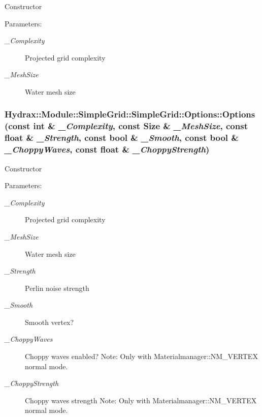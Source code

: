 Constructor \begin{Desc}
\item[Parameters:]
\begin{description}
\item[{\em \_\-Complexity}]Projected grid complexity \item[{\em \_\-MeshSize}]Water mesh size \end{description}
\end{Desc}
\hypertarget{struct_hydrax_1_1_module_1_1_simple_grid_1_1_options_5ed872d6df7b71b6e9a796946f995916}{
\subsubsection[{Options}]{\setlength{\rightskip}{0pt plus 5cm}Hydrax::Module::SimpleGrid::SimpleGrid::Options::Options (const int \& {\em \_\-Complexity}, \/  const {\bf Size} \& {\em \_\-MeshSize}, \/  const float \& {\em \_\-Strength}, \/  const bool \& {\em \_\-Smooth}, \/  const bool \& {\em \_\-ChoppyWaves}, \/  const float \& {\em \_\-ChoppyStrength})}}
\label{struct_hydrax_1_1_module_1_1_simple_grid_1_1_options_5ed872d6df7b71b6e9a796946f995916}


Constructor \begin{Desc}
\item[Parameters:]
\begin{description}
\item[{\em \_\-Complexity}]Projected grid complexity \item[{\em \_\-MeshSize}]Water mesh size \item[{\em \_\-Strength}]Perlin noise strength \item[{\em \_\-Smooth}]Smooth vertex? \item[{\em \_\-ChoppyWaves}]Choppy waves enabled? Note: Only with Materialmanager::NM\_\-VERTEX normal mode. \item[{\em \_\-ChoppyStrength}]Choppy waves strength Note: Only with Materialmanager::NM\_\-VERTEX normal mode. \end{description}
\end{Desc}


